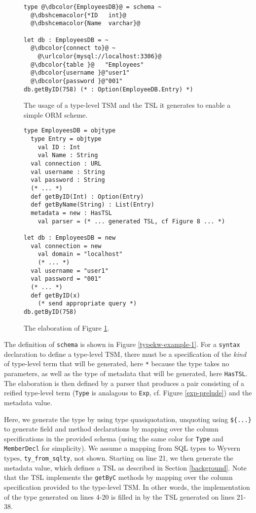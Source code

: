 \documentclass{sig-alternate}
\newcommand{\urlcolor}[1]{\textcolor[HTML]{FFCC33}{#1}}
\newcommand{\dbcolor}[1]{\textcolor[HTML]{FF47FF}{#1}}
\newcommand{\dbshcemacolor}[1]{\textcolor[HTML]{5AC3D1}{#1}}
\newcommand{\mycaption}[1]{\vspace{-4px}\caption{#1}\vspace{-2px}}
\begin{document}
\begin{figure}[t]
\begin{lstlisting}[style=wyvern]
type @\dbcolor{EmployeesDB}@ = schema ~
  @\dbshcemacolor{*ID   int}@
  @\dbshcemacolor{Name  varchar}@

let db : EmployeesDB = ~
  @\dbcolor{connect to}@ ~
    @\urlcolor{mysql://localhost:3306}@
  @\dbcolor{table }@   "Employees"
  @\dbcolor{username }@"user1"
  @\dbcolor{password }@"001"
db.getByID(758) (* : Option(EmployeeDB.Entry) *)
\end{lstlisting}
\mycaption{The usage of a type-level TSM and the TSL it generates to enable a simple ORM scheme.}
\label{f-tykwexample}
\end{figure}

\begin{figure}[t]
\begin{lstlisting}[style=wyvern]
type EmployeesDB = objtype
  type Entry = objtype
    val ID : Int
    val Name : String 
  val connection : URL
  val username : String
  val password : String
  (* ... *)
  def getByID(Int) : Option(Entry)
  def getByName(String) : List(Entry)
  metadata = new : HasTSL
    val parser = (* ... generated TSL, cf Figure 8 ... *)

let db : EmployeesDB = new
  val connection = new
    val domain = "localhost"
    (* ... *)
  val username = "user1"
  val password = "001"
  (* ... *)
  def getByID(x)
    (* send appropriate query *)
db.getByID(758)
\end{lstlisting}
\mycaption{The elaboration of Figure \ref{f-tykwexample}.}
\label{typekw-example-2}
\end{figure}

The definition of \verb|schema| is shown in Figure \ref{typekw-example-1}. For a \verb|syntax| declaration to define a type-level TSM, there must be a specification of the \emph{kind} of type-level term that will be generated, here \verb|*| because the type takes no parameters, as well as the type of metadata that will be generated, here \verb|HasTSL|. The elaboration is then defined by a parser that produces a pair consisting of a reified type-level term (\verb|Type| is analagous to \verb|Exp|, cf. Figure \ref{exp-prelude}) and the metadata value.

Here, we generate the type by using type quasiquotation, unquoting using \verb|${...}| to generate  field and method declarations by mapping over the column specifications in the provided schema (using the same color for \verb|Type| and \verb|MemberDecl| for simplicity). We assume a mapping from SQL types to Wyvern types, \verb|ty_from_sqlty|, not shown. Starting on line 21, we then generate the metadata value, which defines a TSL as described in Section \ref{background}. Note  that the TSL implements the \verb|getByC| methods by mapping over the column specification provided to the type-level TSM. In other words, the implementation of the type generated on lines 4-20 is filled in by the TSL generated on lines 21-38.
\end{document}
